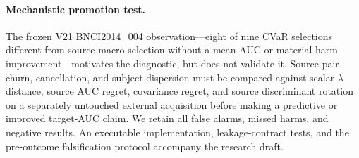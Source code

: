 \paragraph{Mechanistic promotion test.}
The frozen V21 BNCI2014\_004 observation---eight of nine CVaR selections
different from source macro selection without a mean AUC or
material-harm improvement---motivates the diagnostic, but does not
validate it. Source pair-churn, cancellation, and subject dispersion
must be compared against scalar $\lambda$ distance, source AUC regret,
covariance regret, and source discriminant rotation on a separately
untouched external acquisition before making a predictive or improved
target-AUC claim. We retain all false alarms, missed harms, and negative
results. An executable implementation, leakage-contract tests, and the
pre-outcome falsification protocol accompany the research draft.
